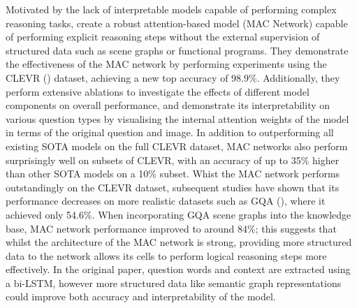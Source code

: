 Motivated by the lack of interpretable models capable of performing complex reasoning tasks, \citeauthor{hudson2018compositional} create a robust attention-based model (MAC Network) capable of performing explicit reasoning steps without the external supervision of structured data such as scene graphs or functional programs. They demonstrate the effectiveness of the MAC network by performing experiments using the CLEVR (\cite{johnson2017clevr}) dataset, achieving a new top accuracy of 98.9\%. Additionally, they perform extensive ablations to investigate the effects of different model components on overall performance, and demonstrate its interpretability on various question types by visualising the internal attention weights of the model in terms of the original question and image. In addition to outperforming all existing SOTA models on the full CLEVR dataset, MAC networks also perform surprisingly well on subsets of CLEVR, with an accuracy of up to 35\% higher than other SOTA models on a 10\% subset. Whist the MAC network performs outstandingly on the CLEVR dataset, subsequent studies have shown that its performance decreases on more realistic datasets such as GQA (\cite{hudson2019gqa}), where it achieved only 54.6\%. When incorporating GQA scene graphs into the knowledge base, MAC network performance improved to around 84\%; this suggests that whilst the architecture of the MAC network is strong, providing more structured data to the network allows its cells to perform logical reasoning steps more effectively. In the original paper, question words and context are extracted using a bi-LSTM, however more structured data like semantic graph representations could improve both accuracy and interpretability of the model.





